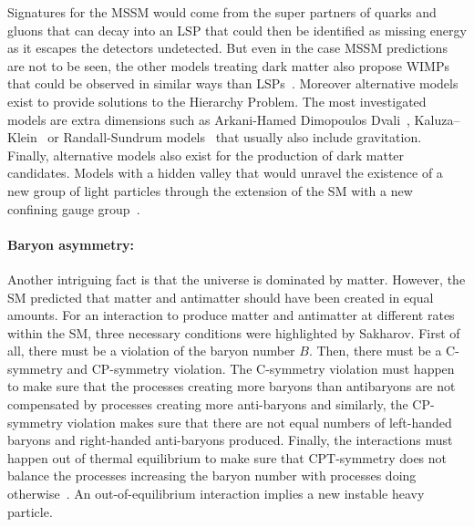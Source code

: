 	Signatures for the MSSM would come from the super partners of quarks and gluons that can decay into an LSP that could then be identified as missing energy as it escapes the detectors undetected. But even in the case MSSM predictions are not to be seen, the other models treating dark matter also propose \acf{WIMPs} that could be observed in similar ways than LSPs~\cite{ASKEW2014}. Moreover alternative models exist to provide solutions to the Hierarchy Problem. The most investigated models are extra dimensions such as Arkani-Hamed Dimopoulos Dvali~\cite{ADD1998,ADD1999}, Kaluza–Klein~\cite{KALUZA1921,KLEIN1926} or Randall-Sundrum models~\cite{RS1999I,RS1999II} that usually also include gravitation. Finally, alternative models also exist for the production of dark matter candidates. Models with a hidden valley that would unravel the existence of a new group of light particles through the extension of the SM with a new confining gauge group~\cite{ZUREK2007}.\\
	 
	\paragraph*{Baryon asymmetry: }
	
	Another intriguing fact is that the universe is dominated by matter. However, the SM predicted that matter and antimatter should have been created in equal amounts. For an interaction to produce matter and antimatter at different rates within the SM, three necessary conditions were highlighted by Sakharov\cite{SAKHAROV1967}. First of all, there must be a violation of the baryon number $B$. Then, there must be a C-symmetry and CP-symmetry violation. The C-symmetry violation must happen to make sure that the processes creating more baryons than antibaryons are not compensated by processes creating more anti-baryons and similarly, the CP-symmetry violation makes sure that there are not equal numbers of left-handed baryons and right-handed anti-baryons produced. Finally, the interactions must happen out of thermal equilibrium to make sure that CPT-symmetry does not balance the processes increasing the baryon number with processes doing otherwise~\cite{SHAPOSHNIKOV1993}. An out-of-equilibrium interaction implies a new instable heavy particle.
	
